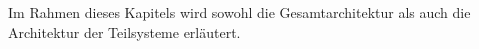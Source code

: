 Im Rahmen dieses Kapitels wird sowohl die Gesamtarchitektur als auch die Architektur der Teilsysteme erläutert.
